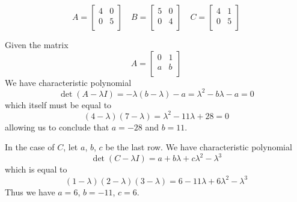 \documentclass[a4paper]{article}
\begin{document}
\[
	A =
	\begin{bmatrix}
		4 & 0 \\
		0 & 5 \\
	\end{bmatrix}
	\quad
	B =
	\begin{bmatrix}
		5 & 0 \\
		0 & 4 \\
	\end{bmatrix}
	\quad
	C =
	\begin{bmatrix}
		4 & 1 \\
		0 & 5 \\
	\end{bmatrix}
\]


Given the matrix
\[
	A =
	\begin{bmatrix}
		0 & 1 \\
		a & b \\
	\end{bmatrix}
\]
We have characteristic polynomial
\[
	\det \!\left( A - \lambda I \right) = -\lambda \!\left( b - \lambda  \right) - a = \lambda^{2} - b \lambda - a  = 0
\]
which itself must be equal to
\[
	\!\left( 4 - \lambda  \right) \!\left( 7 - \lambda  \right) = \lambda^{2} - 11 \lambda + 28 = 0
\]
allowing us to conclude that \(a = -28\) and \(b = 11\).

In the case of \(C\), let \(a\), \(b\), \(c\) be the last row. We have characteristic polynomial
\[
	\det \!\left( C - \lambda I \right) = a + b \lambda + c \lambda^{2} - \lambda^{3}
\]
which is equal to
\[
	\!\left( 1 - \lambda  \right) \!\left( 2 - \lambda  \right) \!\left( 3 - \lambda  \right) = 6 - 11 \lambda + 6 \lambda^{2} - \lambda^{3}
\]
Thus we have \(a = 6\), \(b = -11\), \(c = 6\).

\vspace{12pt}

\end{document}
